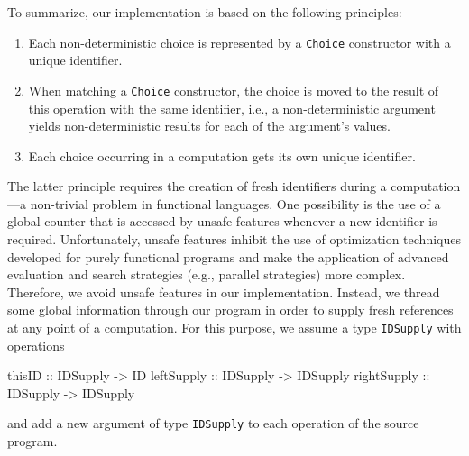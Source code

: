 \documentclass{llncs}
\newcommand{\code}[1]{\mbox{\small\texttt{#1}}}
\begin{document}
To summarize, our implementation is based on the following principles:
\begin{enumerate}
\item Each non-deterministic choice is represented by a \code{Choice}
constructor with a unique identifier.
\item When matching a \code{Choice} constructor, the choice is
moved to the result of this operation with the same identifier,
i.e., a non-deterministic argument
yields non-deterministic results for each of the argument's values.
\item Each choice occurring in a computation gets its own unique
identifier.
\end{enumerate}
The latter principle requires the creation of fresh identifiers
during a computation---a non-trivial problem in functional languages.
One possibility is the use of a global counter
that is accessed by unsafe features whenever a new identifier
is required. Unfortunately, unsafe features inhibit the use
of optimization techniques developed for purely functional programs
and make the application of advanced evaluation and search
strategies (e.g., parallel strategies) more complex.
Therefore, we avoid unsafe features in our implementation.
Instead, we thread some global information
through our program in order to supply fresh references
at any point of a computation.
For this purpose, we assume a type \code{IDSupply}
with operations
\begin{haskell}
  thisID      :: IDSupply -> ID
  leftSupply  :: IDSupply -> IDSupply
  rightSupply :: IDSupply -> IDSupply
\end{haskell}
and add a new argument of type \code{IDSupply} to each operation
of the source program.
\end{document}
